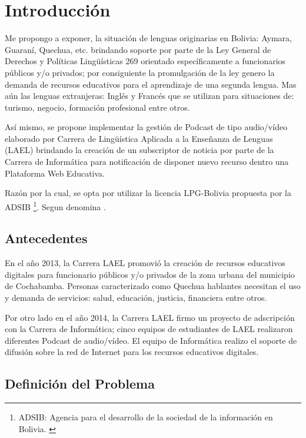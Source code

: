 \chapter{Introducción}

Me propongo a exponer, la situación de lenguas originarias en Bolivia: Aymara,
Guaraní, Quechua, etc. brindando soporte por parte de la Ley General de Derechos y
Políticas Lingüísticas 269  orientado específicamente a funcionarios públicos
y/o privados; por consiguiente la promulgación de la ley genero la demanda de
recursos educativos para el aprendizaje de una segunda lengua. Mas aún las
lenguas extranjeras: Inglés y Francés que se utilizan para situaciones de: turismo,
negocio, formación profesional entre otros.

Así mismo, se propone implementar la gestión de Podcast de tipo audio/vídeo
elaborado por Carrera de Lingüística Aplicada a la Enseñanza de Lenguas (LAEL)
brindando la creación de un subscriptor de noticia por parte de la Carrera de
Informática para notificación de disponer nuevo recurso dentro una Plataforma
Web Educativa.

Razón por la cual, se opta por utilizar la licencia LPG-Bolivia propuesta por
la ADSIB \footnote{ADSIB: Agencia para el desarrollo de la sociedad de la
información en Bolivia. \cite{LPGBolivia}}. Segun \cite{LPGBolivia} denomina 
.


\section{Antecedentes}

En el año 2013, la Carrera LAEL promovió la creación de recursos educativos
digitales para funcionario públicos y/o privados de la zona urbana del
municipio de Cochabamba. Personas caracterizado como Quechua hablantes
necesitan el uso y demanda de servicios: salud, educación, justicia,
financiera entre otros. 

Por otro lado en el año 2014, la Carrera LAEL firmo un proyecto de adscripción
con la Carrera de Informática; cinco equipos de estudiantes de LAEL realizaron
diferentes Podcast de audio/vídeo. El equipo de Informática realizo el soporte
de difusión sobre la red de Internet para los recursos educativos digitales.

\section{Definición del Problema}

